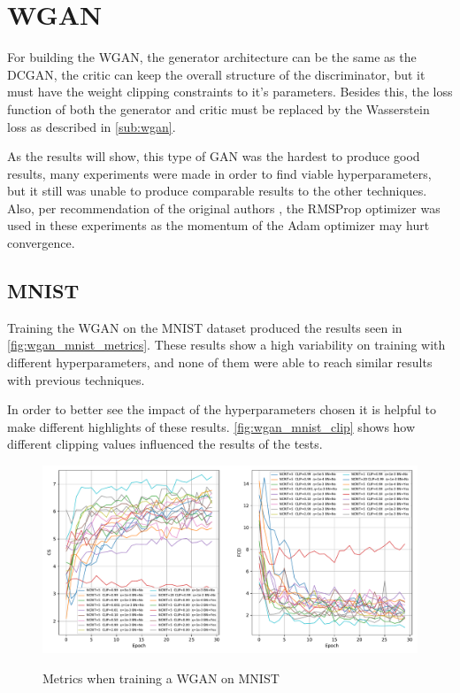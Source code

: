 \section{WGAN}
For building the \gls{WGAN}, the generator architecture can be the same as the \gls{DCGAN}, the critic can keep the overall structure of the discriminator, but it must have the weight clipping constraints to it's parameters. Besides this, the loss function of both the generator and critic must be replaced by the Wasserstein loss as described in \autoref{sub:wgan}.

As the results will show, this type of \gls{GAN} was the hardest to produce good results, many experiments were made in order to find viable hyperparameters, but it still was unable to produce comparable results to the other techniques. Also, per recommendation of the original authors \cite{wasserstein2017}, the RMSProp optimizer was used in these experiments as the momentum of the Adam optimizer may hurt convergence.

\subsection{MNIST}
Training the \gls{WGAN} on the \gls{MNIST} dataset produced the results seen in \autoref{fig:wgan_mnist_metrics}. These results show a high variability on training with different hyperparameters, and none of them were able to reach similar results with previous techniques.

In order to better see the impact of the hyperparameters chosen it is helpful to make different highlights of these results. \autoref{fig:wgan_mnist_clip} shows how different clipping values influenced the results of the tests.

\begin{figure}[hbt]
    \centering
    \caption{Metrics when training a WGAN on MNIST}
    \includegraphics[width=\textwidth]{chapters/Experiments/WGAN/mnist_metrics.pdf}
    \label{fig:wgan_mnist_metrics}
\end{figure}

